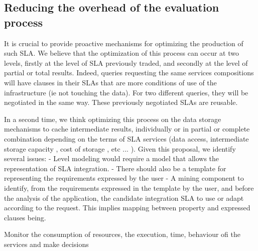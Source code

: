  
\subsection{Reducing the overhead of the evaluation process}
\label{sec:queryProcessOpt}
  
 It is  crucial to provide proactive mechanisms for optimizing the production of such SLA. We believe that the optimization of this process can occur at two levels, firstly at the level of SLA previously traded, and secondly at the level of partial or total results. Indeed, queries requesting the same services compositions will have clauses in their SLAs that are more conditions of use of the infrastructure (ie not touching the data). For two different queries, they will be negotiated in the same way. These previously negotiated SLAs are reusable.

In a second time, we think optimizing this process on the data storage mechanisms to cache intermediate results, individually or in partial or complete combination depending on the terms of SLA services (data access, intermediate storage capacity , cost of storage , etc ... ).
Given this proposal, we identify several issues:
- Level modeling would require a model that allows the representation of SLA integration.
- There should also be a template for representing the requirements expressed by the user
- A mining component to identify, from the requirements expressed in the template by the user, and before the analysis of the application, the candidate integration SLA to use or adapt according to the request. This implies mapping between property and expressed clauses being.

Monitor the consumption of resources, the execution, time, behaviour ofi the services and make decisions
